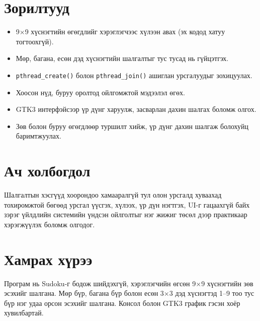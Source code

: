 \documentclass[12pt,a4paper]{report}
\begin{document}
\section{Зорилтууд}
\begin{itemize}
\item 9$\times$9 хүснэгтийн өгөгдлийг хэрэглэгчээс хүлээн авах (эх кодод хатуу тогтоохгүй).
\item Мөр, багана, есөн дэд хүснэгтийн шалгалтыг тус тусад нь гүйцэтгэх.
\item \texttt{pthread\_create()} болон \texttt{pthread\_join()} ашиглан урсгалуудыг зохицуулах.
\item Хоосон нүд, буруу оролтод ойлгомжтой мэдээлэл өгөх.
\item GTK3 интерфэйсээр үр дүнг харуулж, засварлан дахин шалгах боломж олгох.
\item Зөв болон буруу өгөгдлөөр туршилт хийж, үр дүнг дахин шалгаж болохуйц баримтжуулах.
\end{itemize}
\section{Ач холбогдол}
Шалгалтын хэсгүүд хоорондоо хамааралгүй тул олон урсгалд хуваахад тохиромжтой бөгөөд урсгал үүсгэх, хүлээх, үр дүн нэгтгэх, UI-г гацаахгүй байх зэрэг үйлдлийн системийн үндсэн ойлголтыг нэг жижиг төсөл дээр практикаар хэрэгжүүлэх боломж олгодог.
\section{Хамрах хүрээ}
Програм нь Sudoku-г бодож шийдэхгүй, хэрэглэгчийн өгсөн 9$\times$9 хүснэгтийн зөв эсэхийг шалгана. Мөр бүр, багана бүр болон есөн 3$\times$3 дэд хүснэгтэд 1--9 тоо тус бүр нэг удаа орсон эсэхийг шалгана. Консол болон GTK3 график гэсэн хоёр хувилбартай.

\end{document}
